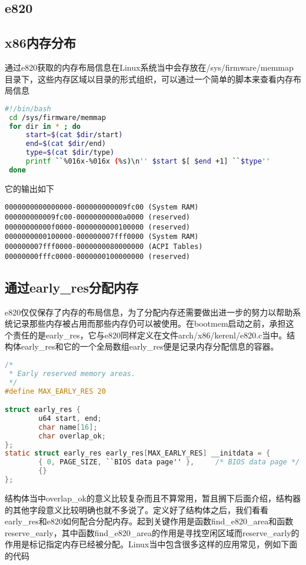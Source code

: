 \documentclass[b5paper,9pt,twoside,openany]{article}
\begin{document}
\subsection{e820}
\subsection{x86内存分布}
通过e820获取的内存布局信息在Linux系统当中会存放在/sys/firmware/memmap目录下，这些内存区域以目录的形式组织，可以通过一个简单的脚本来查看内存布局信息
\begin{lstlisting}[language=bash]
#!/bin/bash
 cd /sys/firmware/memmap
 for dir in * ; do
     start=$(cat $dir/start)
     end=$(cat $dir/end)
     type=$(cat $dir/type)
     printf ``%016x-%016x (%s)\n'' $start $[ $end +1] ``$type''
 done
\end{lstlisting}
它的输出如下
\begin{lstlisting}
0000000000000000-000000000009fc00 (System RAM)
000000000009fc00-00000000000a0000 (reserved)
00000000000f0000-0000000000100000 (reserved)
0000000000100000-000000007fff0000 (System RAM)
000000007fff0000-0000000080000000 (ACPI Tables)
00000000fffc0000-0000000100000000 (reserved)
\end{lstlisting}

\subsection{通过early\_res分配内存}
e820仅仅保存了内存的布局信息，为了分配内存还需要做出进一步的努力以帮助系统记录那些内存被占用而那些内存仍可以被使用。在bootmem启动之前，承担这个责任的是early\_res，它与e820同样定义在文件arch/x86/kerenl/e820.c当中。结构体early\_res和它的一个全局数组early\_res便是记录内存分配信息的容器。
\begin{lstlisting}[language=C]
/*
 * Early reserved memory areas.
 */
#define MAX_EARLY_RES 20

struct early_res {
        u64 start, end;
        char name[16];
        char overlap_ok;
};
static struct early_res early_res[MAX_EARLY_RES] __initdata = {
        { 0, PAGE_SIZE, ``BIOS data page'' },     /* BIOS data page */
        {}
};
\end{lstlisting}
结构体当中overlap\_ok的意义比较复杂而且不算常用，暂且搁下后面介绍，结构器的其他字段意义比较明确也就不多说了。定义好了结构体之后，我们看看early\_res和e820如何配合分配内存。起到关键作用是函数find\_e820\_area和函数reserve\_early，其中函数find\_e820\_area的作用是寻找空闲区域而reserve\_early的作用是标记指定内存已经被分配。Linux当中包含很多这样的应用常见，例如下面的代码
\end{document}
